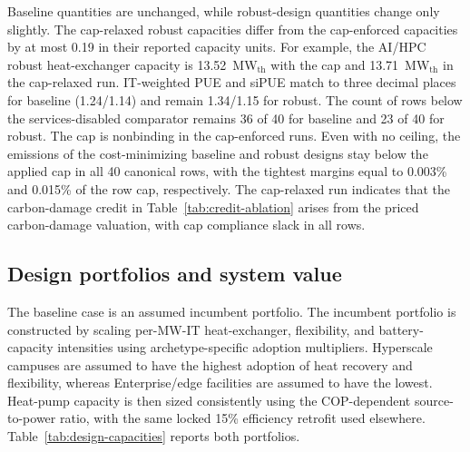 \documentclass[preprint,12pt]{elsarticle}
\begin{document}
Baseline quantities are unchanged, while robust-design quantities change only slightly. The cap-relaxed robust capacities differ from the cap-enforced capacities by at most 0.19 in their reported capacity units. For example, the AI/HPC robust heat-exchanger capacity is 13.52~MW$_{\text{th}}$ with the cap and 13.71~MW$_{\text{th}}$ in the cap-relaxed run. IT-weighted PUE and siPUE match to three decimal places for baseline (1.24/1.14) and remain 1.34/1.15 for robust. The count of rows below the services-disabled comparator remains 36 of 40 for baseline and 23 of 40 for robust. The cap is nonbinding in the cap-enforced runs. Even with no ceiling, the emissions of the cost-minimizing baseline and robust designs stay below the applied cap in all 40 canonical rows, with the tightest margins equal to 0.003\% and 0.015\% of the row cap, respectively. The cap-relaxed run indicates that the carbon-damage credit in Table~\ref{tab:credit-ablation} arises from the priced carbon-damage valuation, with cap compliance slack in all rows.

\subsection{Design portfolios and system value}

The baseline case is an assumed incumbent portfolio. The incumbent portfolio is constructed by scaling per-MW-IT heat-exchanger, flexibility, and battery-capacity intensities using archetype-specific adoption multipliers. Hyperscale campuses are assumed to have the highest adoption of heat recovery and flexibility, whereas Enterprise/edge facilities are assumed to have the lowest. Heat-pump capacity is then sized consistently using the COP-dependent source-to-power ratio, with the same locked 15\% efficiency retrofit used elsewhere. Table~\ref{tab:design-capacities} reports both portfolios.
\end{document}

